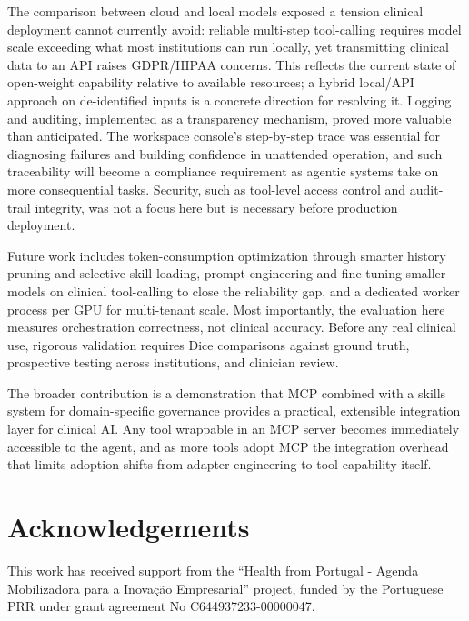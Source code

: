 \documentclass[1p,12pt]{elsarticle}
\begin{document}
The comparison between cloud and local models exposed a tension clinical deployment cannot currently avoid: reliable multi-step tool-calling requires model scale exceeding what most institutions can run locally, yet transmitting clinical data to an API raises GDPR/HIPAA concerns. This reflects the current state of open-weight capability relative to available resources; a hybrid local/API approach on de-identified inputs is a concrete direction for resolving it. Logging and auditing, implemented as a transparency mechanism, proved more valuable than anticipated. The workspace console's step-by-step trace was essential for diagnosing failures and building confidence in unattended operation, and such traceability will become a compliance requirement as agentic systems take on more consequential tasks. Security, such as tool-level access control and audit-trail integrity, was not a focus here but is necessary before production deployment.

Future work includes token-consumption optimization through smarter history pruning and selective skill loading, prompt engineering and fine-tuning smaller models on clinical tool-calling to close the reliability gap, and a dedicated worker process per GPU for multi-tenant scale. Most importantly, the evaluation here measures orchestration correctness, not clinical accuracy. Before any real clinical use, rigorous validation requires Dice comparisons against ground truth, prospective testing across institutions, and clinician review. 

The broader contribution is a demonstration that MCP combined with a skills system for domain-specific governance provides a practical, extensible integration layer for clinical AI. Any tool wrappable in an MCP server becomes immediately accessible to the agent, and as more tools adopt MCP the integration overhead that limits adoption shifts from adapter engineering to tool capability itself. %

\section{Acknowledgements}
This work has received support from the “Health from Portugal - Agenda Mobilizadora para a Inovação Empresarial” project, funded by the Portuguese PRR under grant agreement No C644937233-00000047.



\end{document}
